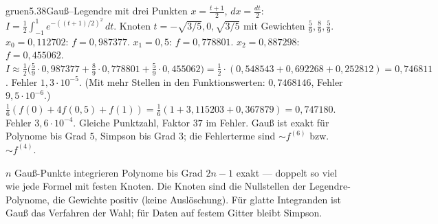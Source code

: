\begin{loesungkarte}{gruen}{5.38}{Gauß--Legendre mit drei Punkten}
$x = \frac{t + 1}2$, $dx = \frac{dt}2$: $I = \frac12\int_{-1}^{1}e^{-((t + 1)/2)^{2}}\,dt$. Knoten $t = -\sqrt{3/5}, 0, \sqrt{3/5}$ mit Gewichten $\frac59, \frac89, \frac59$.
$x_0 = 0{,}112702$: $f = 0{,}987377$. $x_1 = 0{,}5$: $f = 0{,}778801$. $x_2 = 0{,}887298$: $f = 0{,}455062$. \\
$I\approx\frac12\bigl(\frac59\cdot0{,}987377 + \frac89\cdot0{,}778801 + \frac59\cdot0{,}455062\bigr) = \frac12\cdot(0{,}548543 + 0{,}692268 + 0{,}252812) = 0{,}746811$. Fehler $1{,}3\cdot10^{-5}$. (Mit mehr Stellen in den Funktionswerten: $0{,}7468146$, Fehler $9{,}5\cdot10^{-6}$.)
$\frac16(f(0) + 4f(0{,}5) + f(1)) = \frac16(1 + 3{,}115203 + 0{,}367879) = 0{,}747180$. Fehler $3{,}6\cdot10^{-4}$.
Gleiche Punktzahl, Faktor $37$ im Fehler. Gauß ist exakt für Polynome bis Grad $5$, Simpson bis Grad $3$; die Fehlerterme sind $\sim f^{(6)}$ bzw.\ $\sim f^{(4)}$.
\begin{mitnehmen}\kastentext
$n$ Gauß-Punkte integrieren Polynome bis Grad $2n - 1$ exakt --- doppelt so viel wie jede Formel mit festen Knoten. Die Knoten sind die Nullstellen der Legendre-Polynome, die Gewichte positiv (keine Auslöschung). Für glatte Integranden ist Gauß das Verfahren der Wahl; für Daten auf festem Gitter bleibt Simpson.
\end{mitnehmen}
\end{loesungkarte}


